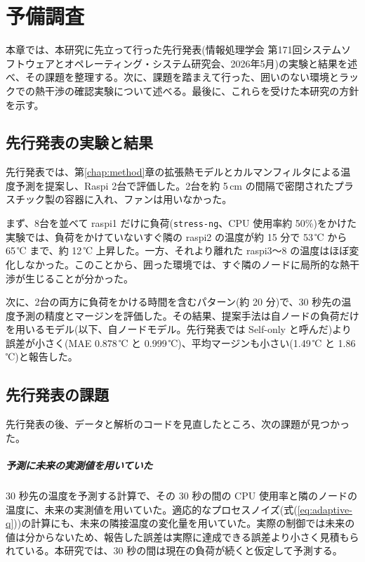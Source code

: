 \chapter{予備調査}\label{chap:preliminary}

本章では、本研究に先立って行った先行発表(情報処理学会 第171回システムソフトウェアとオペレーティング・システム研究会、2026年5月\cite{suzuki2026ipsj})の実験と結果を述べ、その課題を整理する。次に、課題を踏まえて行った、囲いのない環境とラックでの熱干渉の確認実験について述べる。最後に、これらを受けた本研究の方針を示す。

\section{先行発表の実験と結果}\label{sec:pre-ipsj}
先行発表では、第\ref{chap:method}章の拡張熱モデルとカルマンフィルタによる温度予測を提案し、Raspi 2台で評価した。2台を約 5\,cm の間隔で密閉されたプラスチック製の容器に入れ、ファンは用いなかった。

まず、8台を並べて raspi1 だけに負荷(\texttt{stress-ng}、CPU 使用率約 50\%)をかけた実験では、負荷をかけていないすぐ隣の raspi2 の温度が約 15 分で 53\,℃ から 65\,℃ まで、約 12\,℃ 上昇した。一方、それより離れた raspi3〜8 の温度はほぼ変化しなかった。このことから、囲った環境では、すぐ隣のノードに局所的な熱干渉が生じることが分かった。

次に、2台の両方に負荷をかける時間を含むパターン(約 20 分)で、30 秒先の温度予測の精度とマージンを評価した。その結果、提案手法は自ノードの負荷だけを用いるモデル(以下、自ノードモデル。先行発表では Self-only と呼んだ)より誤差が小さく(MAE 0.878\,℃ と 0.999\,℃)、平均マージンも小さい(1.49\,℃ と 1.86\,℃)と報告した。

\section{先行発表の課題}\label{sec:pre-issues}
先行発表の後、データと解析のコードを見直したところ、次の課題が見つかった。

\paragraph{予測に未来の実測値を用いていた}
30 秒先の温度を予測する計算で、その 30 秒の間の CPU 使用率と隣のノードの温度に、未来の実測値を用いていた。適応的なプロセスノイズ(式(\ref{eq:adaptive-q}))の計算にも、未来の隣接温度の変化量を用いていた。実際の制御では未来の値は分からないため、報告した誤差は実際に達成できる誤差より小さく見積もられている。本研究では、30 秒の間は現在の負荷が続くと仮定して予測する。

